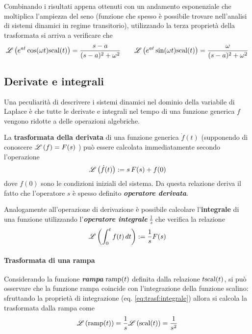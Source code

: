 	    Combinando i risultati appena ottenuti con un andamento esponenziale che moltiplica l'ampiezza del seno (funzione che spesso è possibile trovare nell'analisi di sistemi dinamici in regime transitorio), utilizzando la terza proprietà della trasformata si arriva a verificare che
	    \[ \mathscr L \left( e^{at}\cos(\omega t) \textrm{scal} (t) \right) = \frac{s-a}{(s-a)^2+\omega^2} \qquad \mathscr L \left( e^{at}\sin(\omega t) \textrm{scal} (t) \right) = \frac{\omega}{(s-a)^2+\omega^2} \]
	    
	\subsection{Derivate e integrali}
		Una peculiarità di descrivere i sistemi dinamici nel dominio della variabile di Laplace è che tutte le derivate e integrali nel tempo di una funzione generica $f$ vengono ridotte a delle operazioni algebriche.
		\begin{concetto}
			La \textbf{trasformata della derivata} di una funzione generica $\dot f(t)$ (supponendo di conoscere $\mathscr L \left( f \right) = F(s)$ ) può essere calcolata immediatamente secondo l'operazione
			\begin{equation} \label{eq:class:derivata}
				\mathscr L \left( \dot f(t) \right) := s \, F(s) + f(0)
			\end{equation}
			dove $f(0)$ sono le condizioni iniziali del sistema. Da questa relazione deriva il fatto che l'operatore $s$ è spesso definito \textbf{\textit{operatore derivata}}.
			\vspace{2mm}
			
			Analogamente all'operazione di derivazione è possibile calcolare l'\textbf{integrale} di una funzione utilizzando l'\textbf{\textit{operatore integrale}} $\frac 1 s$ che verifica la relazione
			\begin{equation} \label{eq:trasf:integrale}
				\mathscr L \left( \int_0^t f(t)\, dt \right) : = \frac 1 s F(s)
			\end{equation}
		\end{concetto}
	
		\paragraph{Trasformata di una rampa} Considerando la funzione \textbf{\textit{rampa}} $\textrm{ramp}(t)$ definita dalla relazione $t \textrm{scal}(t)$, si può osservare che la funzione rampa coincide con l'integrazione della funzione scalino: sfruttando la proprietà di integrazione (eq. \ref{eq:trasf:integrale}) allora si calcola la trasformata dalla rampa come
		\begin{equation}
			\mathscr L \left( \textrm{ramp}(t) \right) = \frac 1 s \mathscr L \left( \textrm{scal}(t) \right) = \frac{1}{s^2}
		\end{equation}
		
